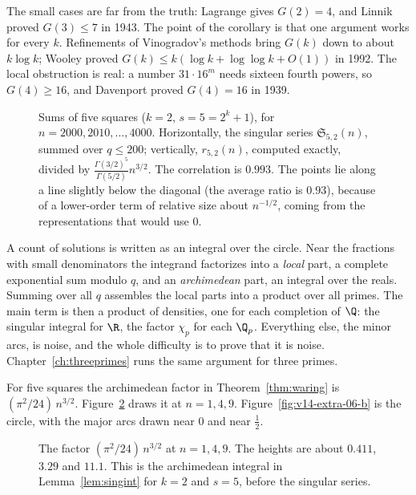 The small cases are far from the truth: Lagrange gives $G(2)=4$, and Linnik proved $G(3)\le7$ in 1943. The point of the corollary is that one argument works for every $k$. Refinements of Vinogradov's methods bring $G(k)$ down to about $k\log k$; Wooley proved $G(k)\le k(\log k+\log\log k+O(1))$ in 1992. The local obstruction is real: a number $31\cdot16^m$ needs sixteen fourth powers, so $G(4)\ge16$, and Davenport proved $G(4)=16$ in 1939.

\begin{figure}[ht]
\centering
{}
\caption{Sums of five squares ($k=2$, $s=5=2^k+1$), for $n=2000,2010,\dots,4000$. Horizontally, the singular series $\mathfrak S_{5,2}(n)$, summed over $q\le200$; vertically, $r_{5,2}(n)$, computed exactly, divided by $\frac{\Gamma(3/2)^5}{\Gamma(5/2)}n^{3/2}$. The correlation is $0.993$. The points lie along a line slightly below the diagonal (the average ratio is $0.93$), because of a lower-order term of relative size about $n^{-1/2}$, coming from the representations that would use $0$.}
\label{fig:fivesquares}
\end{figure}

\begin{beauty}
A count of solutions is written as an integral over the circle. Near the fractions with small denominators the integrand factorizes into a \emph{local} part, a complete exponential sum modulo $q$, and an \emph{archimedean} part, an integral over the reals. Summing over all $q$ assembles the local parts into a product over all primes. The main term is then a product of densities, one for each completion of $\Q$: the singular integral for $\R$, the factor $\chi_p$ for each $\Q_p$. Everything else, the minor arcs, is noise, and the whole difficulty is to prove that it is noise. Chapter~\ref{ch:threeprimes} runs the same argument for three primes.
\end{beauty}

For five squares the archimedean factor in Theorem~\ref{thm:waring} is $(\pi^2/24)\,n^{3/2}$. Figure~\ref{fig:v14-extra-06-a} draws it at $n=1,4,9$. Figure~\ref{fig:v14-extra-06-b} is the circle, with the major arcs drawn near $0$ and near $\frac12$.

\begin{figure}[ht]
\centering
{}
\caption{The factor $(\pi^2/24)\,n^{3/2}$ at $n=1,4,9$. The heights are about $0.411$, $3.29$ and $11.1$. This is the archimedean integral in Lemma~\ref{lem:singint} for $k=2$ and $s=5$, before the singular series.}
\label{fig:v14-extra-06-a}
\end{figure}

